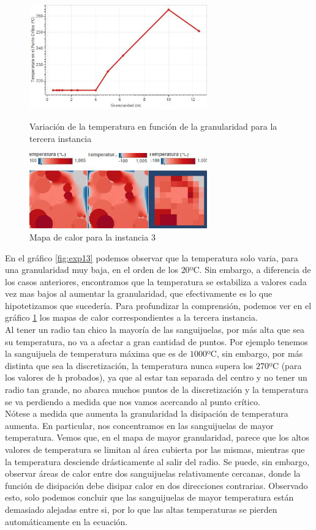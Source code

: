 \begin{figure}[b]
    \centering
    \includegraphics[width=0.685\textwidth]{experimento 1-3}
    \caption{Variación de la temperatura en función de la granularidad para la tercera instancia}
    \label{fig:exp13}
    
    \includegraphics[width=0.685\textwidth]{Ejemplo Instancia 3}
    \caption{Mapa de calor para la instancia 3}
    \label{fig:exp13-vis}
\end{figure}

En el gráfico \ref{fig:exp13} podemos observar que la temperatura solo varia, para una granularidad muy baja, en el orden de los $20$ºC. Sin embargo, a diferencia de los casos anteriores, encontramos que la temperatura se estabiliza a valores cada vez mas bajos al aumentar la granularidad, que efectivamente es lo que hipotetizamos que sucedería. Para profundizar la comprensión, podemos ver en el gráfico \ref{fig:exp13-vis} los mapas de calor correspondientes a la tercera instancia.
\\
   Al tener un radio tan chico la mayoría de las sanguijuelas, por más alta que sea su temperatura, no va a afectar a gran cantidad de puntos. Por ejemplo tenemos la sanguijuela de temperatura máxima que es de $1000$ºC, sin embargo,  por más distinta que sea la discretización, la temperatura nunca supera los $270$ºC (para los valores de h probados), ya que al estar tan separada del centro y no tener un radio tan grande, no abarca muchos puntos de la discretización y la temperatura se va perdiendo a medida que nos vamos acercando al punto crítico.
\\
Nótese a medida que aumenta la granularidad la disipación de temperatura aumenta. En particular, nos concentramos en las sanguijuelas de mayor temperatura. Vemos que, en el mapa de mayor granularidad, parece que los altos valores de temperatura se limitan al área cubierta por las mismas, mientras que la temperatura desciende drásticamente al salir del radio. Se puede, sin embargo, observar áreas de calor entre dos sanguijuelas relativamente cercanas, donde la función de disipación debe disipar calor en dos direcciones contrarias. Observado esto, solo podemos concluir que las sanguijuelas de mayor temperatura están demasiado alejadas entre si, por lo que las altas temperaturas se pierden automáticamente en la ecuación.

